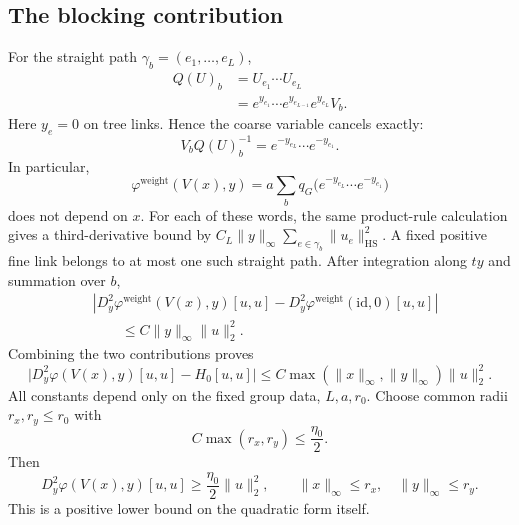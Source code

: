 \documentclass[10pt,reqno]{amsart}
\theoremstyle{definition}
\theoremstyle{remark}
\numberwithin{equation}{section}
\numberwithin{figure}{section}
\newcommand{\id}{\mathrm{id}}
\begin{document}
\subsection{The blocking contribution}
For the straight path $\gamma_b=(e_1,\ldots,e_L)$,
\begin{equation}\label{eq:exact-straight-path-word}
\begin{aligned}
Q(U)_b&=U_{e_1}\cdots U_{e_L}\\
&=e^{y_{e_1}}\cdots e^{y_{e_{L-1}}}e^{y_{e_L}}V_b.
\end{aligned}
\end{equation}
Here $y_e=0$ on tree links. Hence the coarse variable cancels exactly:
\begin{equation}\label{eq:exact-noise-cancellation}
V_bQ(U)_b^{-1}=e^{-y_{e_L}}\cdots e^{-y_{e_1}}.
\end{equation}
In particular,
\begin{equation}\label{eq:blocking-action-independent-of-x}
\varphi^{\mathrm{weight}}(V(x),y)
=a\sum_bq_G\bigl(e^{-y_{e_L}}\cdots e^{-y_{e_1}}\bigr)
\end{equation}
does not depend on $x$. For each of these words, the same product-rule
calculation gives a third-derivative bound by
$C_L\|y\|_\infty\sum_{e\in\gamma_b}\|u_e\|_{\mathrm{HS}}^2$.
A fixed positive fine link belongs to at most one such straight path.
After integration along $ty$ and summation over $b$,
\begin{equation}\label{eq:weight-hessian-stability}
\begin{aligned}
&|D_y^2\varphi^{\mathrm{weight}}(V(x),y)[u,u]
-D_y^2\varphi^{\mathrm{weight}}(\id,0)[u,u]|\\
&\qquad\le C\|y\|_\infty\|u\|_2^2.
\end{aligned}
\end{equation}
Combining the two contributions proves
\begin{equation}\label{eq:full-hessian-quadratic-stability}
\boxed{\bigl|D_y^2\varphi(V(x),y)[u,u]-H_0[u,u]\bigr|
\le C\max(\|x\|_\infty,\|y\|_\infty)\|u\|_2^2.}
\end{equation}
All constants depend only on the fixed group data, $L,a,r_0$.
Choose common radii $r_x,r_y\le r_0$ with
\begin{equation}\label{eq:positive-hessian-radii}
C\max(r_x,r_y)\le\frac{\eta_0}{2}.
\end{equation}
Then
\begin{equation}\label{eq:common-positive-hessian}
\boxed{D_y^2\varphi(V(x),y)[u,u]
\ge\frac{\eta_0}{2}\|u\|_2^2,\qquad
\|x\|_\infty\le r_x,\quad\|y\|_\infty\le r_y.}
\end{equation}
This is a positive lower bound on the quadratic form itself.
\end{document}
